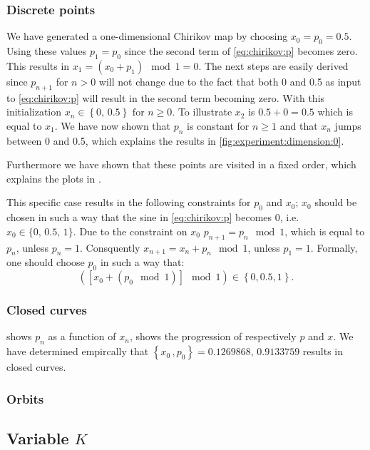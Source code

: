 	\subsubsection{Discrete points}
	We have generated a one-dimensional Chirikov map by choosing $x_0 = p_0 = 0.5$. Using these values $p_1 = p_0$ since the second term of \eqref{eq:chirikov:p} becomes zero. This results in $x_1 = \left( x_0 + p_{1} \right) \mod 1= 0$. The next steps are easily derived since $p_{n + 1}$ for $n > 0$ will not change due to the fact that both 0 and 0.5 as input to \eqref{eq:chirikov:p} will result in the second term becoming zero. With this initialization $x_{n} \in \left\{0,\, 0.5 \right\} \text{ for } n \geq 0$. To illustrate $x_2$ is $0.5 + 0 = 0.5$ which is equal to $x_1$. We have now shown that $p_n$ is constant for $n \geq 1$ and that $x_n$ jumps between 0 and 0.5, which explains the results in \cref{fig:experiment:dimension:0}. 

	Furthermore we have shown that these points are visited in a fixed order, which explains the plots in .

	This specific case results in the following constraints for $p_0$ and $x_0$; $x_0$ should be chosen in such a way that the sine in \cref{eq:chirikov:p} becomes 0, i.e. $x_0 \in \{0,\, 0.5,\, 1\}$. Due to the constraint on $x_0$ $p_{n + 1} = p_{n} \mod 1$, which is equal to $p_n$, unless $p_n = 1$. Consquently $x_{n + 1} = x_n + p_n \mod 1$, unless $p_1 = 1$. Formally, one should choose $p_0$ in such a way that:
	\begin{equation*}
		\left( \left[ x_0 + (p_0 \mod 1)\right] \mod 1 \right) \in \left\{0, 0.5, 1\right\}.
	\end{equation*}
	
	\subsubsection{Closed curves}
	 shows $p_n$ as a function of $x_n$,  shows the progression of respectively $p$ and $x$. We have determined empircally that $\left\{x_0\,, p_0 \right\} = {\num{0.1269868},\,\num{0.9133759}}$ results in closed curves. 


	\subsubsection{Orbits}	

	

\subsection[]{Variable $K$}
\label{ss:variable}